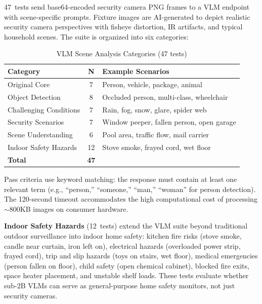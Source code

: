 \documentclass[conference]{IEEEtran}
\begin{document}
47~tests send base64-encoded security camera PNG frames to a VLM
endpoint with scene-specific prompts. Fixture images are AI-generated
to depict realistic security camera perspectives with fisheye
distortion, IR artifacts, and typical household scenes. The
suite is organized into six categories:

\begin{table}[h]
\centering
\caption{VLM Scene Analysis Categories (47 tests)}
\label{tab:vlm_tests}
\begin{tabular}{p{3.2cm}cl}
\toprule
\textbf{Category} & \textbf{N} & \textbf{Example Scenarios} \\
\midrule
Original Core & 7 & Person, vehicle, package, animal \\
Object Detection & 8 & Occluded person, multi-class, wheelchair \\
Challenging Conditions & 7 & Rain, fog, snow, glare, spider web \\
Security Scenarios & 7 & Window peeper, fallen person, open garage \\
Scene Understanding & 6 & Pool area, traffic flow, mail carrier \\
Indoor Safety Hazards & 12 & Stove smoke, frayed cord, wet floor \\
\midrule
\textbf{Total} & \textbf{47} & \\
\bottomrule
\end{tabular}
\end{table}

Pass criteria use keyword matching: the response must contain at least
one relevant term (e.g., ``person,'' ``someone,'' ``man,'' ``woman''
for person detection). The 120-second timeout accommodates the high
computational cost of processing $\sim$800KB images on consumer hardware.

\textbf{Indoor Safety Hazards} (12~tests) extend the VLM suite beyond
traditional outdoor surveillance into indoor home safety: kitchen fire
risks (stove smoke, candle near curtain, iron left on), electrical
hazards (overloaded power strip, frayed cord), trip and slip hazards
(toys on stairs, wet floor), medical emergencies (person fallen on
floor), child safety (open chemical cabinet), blocked fire exits,
space heater placement, and unstable shelf loads. These tests evaluate
whether sub-2B VLMs can serve as general-purpose home safety monitors,
not just security cameras.

\end{document}
